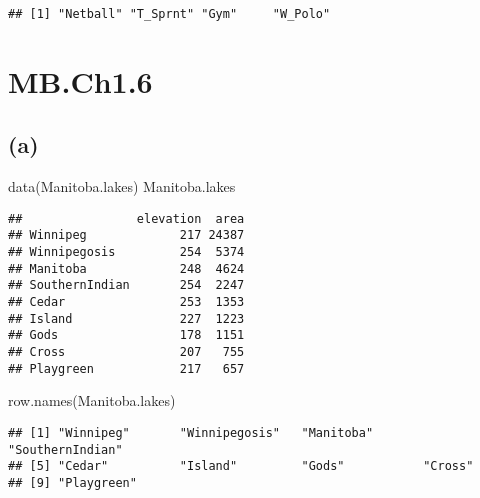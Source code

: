 \documentclass[
]{article}
\newenvironment{Shaded}{\begin{snugshade}}{\end{snugshade}}
\newcommand{\FunctionTok}[1]{\textcolor[rgb]{0.00,0.00,0.00}{#1}}
\newcommand{\NormalTok}[1]{#1}
\begin{document}
\begin{verbatim}
## [1] "Netball" "T_Sprnt" "Gym"     "W_Polo"
\end{verbatim}

\hypertarget{mb.ch1.6}{%
\section{MB.Ch1.6}\label{mb.ch1.6}}

\hypertarget{a-4}{%
\subsection{(a)}\label{a-4}}

\begin{Shaded}
\begin{Highlighting}[]
\FunctionTok{data}\NormalTok{(Manitoba.lakes)}
\NormalTok{Manitoba.lakes}
\end{Highlighting}
\end{Shaded}

\begin{verbatim}
##                elevation  area
## Winnipeg             217 24387
## Winnipegosis         254  5374
## Manitoba             248  4624
## SouthernIndian       254  2247
## Cedar                253  1353
## Island               227  1223
## Gods                 178  1151
## Cross                207   755
## Playgreen            217   657
\end{verbatim}

\begin{Shaded}
\begin{Highlighting}[]
\FunctionTok{row.names}\NormalTok{(Manitoba.lakes)}
\end{Highlighting}
\end{Shaded}

\begin{verbatim}
## [1] "Winnipeg"       "Winnipegosis"   "Manitoba"       "SouthernIndian"
## [5] "Cedar"          "Island"         "Gods"           "Cross"         
## [9] "Playgreen"
\end{verbatim}
\end{document}
